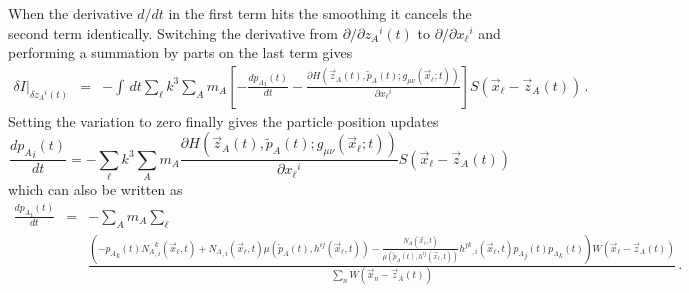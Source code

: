 When the derivative $d/dt$ in the first term hits the smoothing it cancels the second
term identically.  
Switching the derivative from $\partial/ \partial {z_A}^i(t)$ 
to $\partial/\partial {x_{\ell}}^i$ and performing a summation by parts 
on the last term gives
\begin{eqnarray*}
  \delta I \vert_{\delta {z_A}^i(t)} & = & - \int \, dt \sum _{\ell} k^3 \sum _{A} m_A
                                      \left[
     	  							   -\frac{ d {p_A}_i(t) }{d t}									  
									  - 
                                        \frac{ \partial H(\vec z_A(t),
										                  \tilde p_A(t);
                                                          g_{\mu\nu}(\vec x_{\ell};t)) 
									         }
									         { \partial {x_{\ell}}^i}
									  \right]
										     S({\vec x}_{\ell} - {\vec z}_A(t)) \, .
\end{eqnarray*}
Setting the variation to zero finally gives the particle position updates
\[
  \frac{ d {p_A}_i(t) }{d t}  =  -\sum _{\ell} k^3 \sum _{A} m_A
                                    \frac{ \partial H(\vec z_A(t),
	         							              \tilde p_A(t);
                                                      g_{\mu\nu}(\vec x_{\ell};t)) 
									     }
									     { \partial {x_{\ell}}^i}
									     S({\vec x}_{\ell} - {\vec z}_A(t)) 
\]
which can also be written as
\begin{eqnarray*}
  \frac{ d {p_A}_i(t) }{d t}  & = & - \sum _{A} m_A \sum _{\ell} \\
                              &   &  \frac{ \left(
									        -{p_A}_k(t) 
											{N_A}^k_{,i}(\vec x_{\ell},t)
											+ {N_A}_{,i}(\vec x_{\ell},t)
											\mu(\tilde p_A(t),h^{ij}(\vec x_{\ell},t))
											-\frac{{N_A}(\vec x_{\ell},t)}
											      {\mu(\tilde p_A(t),h^{ij}(\vec x_{\ell},t))}
											 {h^{jk}}_{,i}(\vec x_{\ell},t) 
											 {p_A}_j(t)
											 {p_A}_k(t)
									       \right) 
										   W({\vec x}_{\ell} - {\vec z}_A(t))
									     }
									     { \sum _n W({\vec x}_n - {\vec z}_A(t)) }\, .
\end{eqnarray*}





